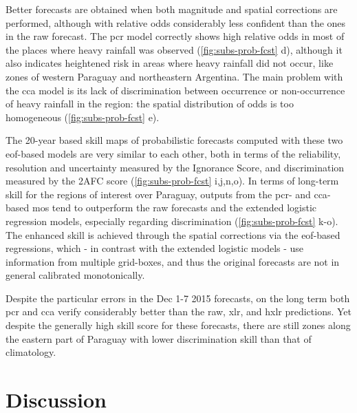 \documentclass{ametsoc}
\begin{document}
Better forecasts are obtained when both magnitude and spatial corrections are performed, although with relative odds considerably less confident than the ones in the raw forecast.
The \gls{pcr} model correctly shows high relative odds in most of the places where heavy rainfall was observed (\cref{fig:subs-prob-fcst} d), although it also indicates heightened risk in areas where heavy rainfall did not occur, like zones of western Paraguay and northeastern Argentina.
The main problem with the \gls{cca} model is its lack of discrimination between occurrence or non-occurrence of heavy rainfall in the region: the spatial distribution of odds is too homogeneous (\cref{fig:subs-prob-fcst} e).

The 20-year based skill maps of probabilistic forecasts computed with these two \gls{eof}-based models are very similar to each other, both in terms of the reliability, resolution and uncertainty measured by the Ignorance Score, and discrimination measured by the 2AFC score (\cref{fig:subs-prob-fcst} i,j,n,o).
In terms of long-term skill for the regions of interest over Paraguay, outputs from the \gls{pcr}- and \gls{cca}-based \gls{mos} tend to outperform the raw forecasts and the extended logistic regression models, especially regarding discrimination (\cref{fig:subs-prob-fcst} k-o).
The enhanced skill is achieved through the spatial corrections via the \gls{eof}-based regressions, which - in contrast with the extended logistic models - use information from multiple grid-boxes, and thus the original forecasts are not in general calibrated monotonically.

Despite the particular errors in the Dec 1-7 2015 forecasts, on the long term both \gls{pcr} and \gls{cca} verify considerably better than the raw, \gls{xlr}, and \gls{hxlr} predictions.
Yet despite the generally high skill score for these forecasts, there are still zones along the eastern part of Paraguay with lower discrimination skill than that of climatology.


\section{Discussion}\label{sec:discussion}
\end{document}
